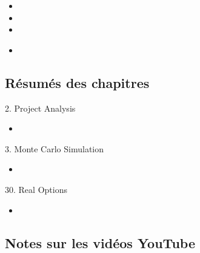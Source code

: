 \begin{ASM_chapter}
\begin{itemize}
	\item	{}
	\item	{}
	\item	{}
\end{itemize}
\end{ASM_chapter}

\begin{YTB_vids}
\begin{itemize}
	\item	
\end{itemize}
\end{YTB_vids}

\subsection{Résumés des chapitres}

\begin{CHPT_SUMM_AUTO}[label = {L.-2}]{2. Project Analysis}
	\begin{itemize}
		\item	
	\end{itemize}
\end{CHPT_SUMM_AUTO}

\begin{CHPT_SUMM_AUTO}[label = {L.-3}]{3. Monte Carlo Simulation}
	\begin{itemize}
		\item	
	\end{itemize}
\end{CHPT_SUMM_AUTO}

\begin{CHPT_SUMM_AUTO}[label = {L.-30}]{30. Real Options}
	\begin{itemize}
		\item	
	\end{itemize}
\end{CHPT_SUMM_AUTO}

\subsection{Notes sur les vidéos YouTube}

